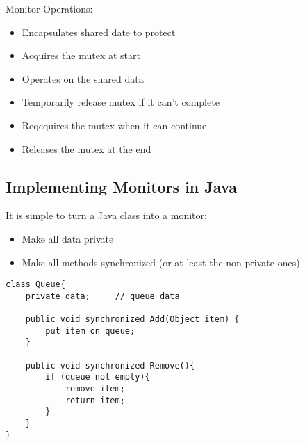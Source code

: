Monitor Operations:
\begin{itemize}
    \item Encapsulates shared date to protect
    \item Acquires the mutex at start
    \item Operates on the shared data
    \item Temporarily release mutex if it can't complete
    \item Reqcquires the mutex when it can continue
    \item Releases the mutex at the end
\end{itemize}

\subsection{Implementing Monitors in Java}

It is simple to turn a Java class into a monitor:

\begin{itemize}
    \item Make all data private
    \item Make all methods synchronized (or at least the non-private ones)
\end{itemize}

\begin{verbatim}
class Queue{
    private data;     // queue data

    public void synchronized Add(Object item) {
        put item on queue;
    }

    public void synchronized Remove(){
        if (queue not empty){
            remove item;
            return item;
        }
    }
}
\end{verbatim}


